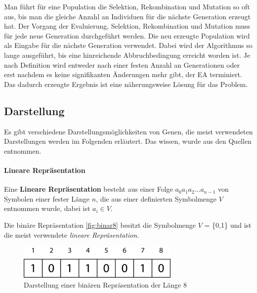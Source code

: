 Man f{\"u}hrt f{\"u}r eine Population die Selektion, Rekombination und Mutation so oft aus, bis man die gleiche Anzahl an Individuen f{\"u}r die n{\"a}chste Generation erzeugt hat.
Der Vorgang der Evaluierung, Selektion, Rekombination und Mutation muss f{\"u}r jede neue Generation durchgef{\"u}hrt werden. 
Die neu erzeugte Population wird als Eingabe f{\"u}r die n{\"a}chste Generation verwendet. 
Dabei wird der Algorithmus so lange ausgef{\"u}hrt, bis eine hinreichende Abbruchbedingung erreicht worden ist. 
Je nach Definition wird entweder nach einer festen Anzahl an Generationen oder erst nachdem es keine signifikanten {\"A}nderungen mehr gibt, der EA terminiert.
Das dadurch erzeugte Ergebnis ist eine n{\"a}herungsweise L{\"o}sung f{\"u}r das Problem.

\subsection{Darstellung}
Es gibt verschiedene Darstellungsm{\"o}glichkeiten von Genen, die meist verwendeten Darstellungen werden im Folgenden erl{\"a}utert. 
Das wissen, wurde aus den Quellen \cite{flickevolutionare, shiffman2012nature, DillmannZoeller2017} entnommen.

\paragraph{Lineare Repr{\"a}sentation}
Eine \textbf{Lineare Repr{\"a}sentation} besteht aus einer Folge $a_{0}a_{1}a_{2}...a_{n-1}$ von Symbolen einer fester L{\"a}nge $n$, die aus einer definierten Symbolmenge $V$ entnommen wurde, dabei ist $a_{i} \in V$.   

Die bin{\"a}re Repr{\"a}sentation \autoref{fig:binar8} besitzt die Symbolmenge $V$ = \{0,1\} und ist die meist verwendete \textit{lineare Repr{\"a}sentation}. 

\begin{figure}
	\centering
    \includegraphics[width=0.7\textwidth]{pics/grundlage/binar8.png}
    \caption{Darstellung einer bin{\"a}ren Repr{\"a}sentation der L{\"a}nge 8}
    \label{fig:binar8}
\end{figure}


